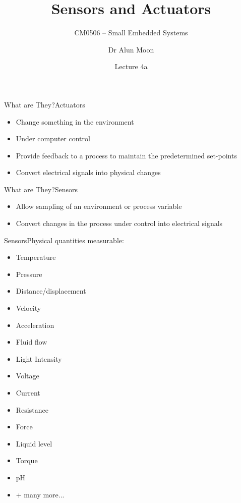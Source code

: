 \documentclass[svgnames,x11names]{beamer}
\title{Sensors and Actuators}
\subtitle{CM0506 -- Small Embedded Systems}
\date{Lecture 4a}
\author{Dr Alun Moon}
\institute{Department of Computer and Information Science}
\begin{document}
\frame\maketitle

\begin{frame}{What are They?}{Actuators}
  \begin{itemize}
  \item Change something in the environment 
  \item Under computer control
  \item  Provide feedback to a process to maintain the predetermined
    set-points 
  \item  Convert electrical signals into physical changes
  \end{itemize}
\end{frame}
\begin{frame}{What are They?}{Sensors}
  \begin{itemize}
  \item Allow sampling of an environment or process
    variable 
  \item Convert changes in the process under control into
    electrical signals
  \end{itemize}

\end{frame}

\begin{frame}{Sensors}{Physical quantities measurable:}
\begin{itemize}
\item Temperature
\item Pressure
\item Distance/displacement
\item Velocity
\item Acceleration
\item Fluid flow
\item Light Intensity
\item Voltage
\item Current
\item Resistance
\item Force
\item Liquid level
\item Torque
\item pH
\item + many more...
\end{itemize}
\end{frame}
\end{document}
